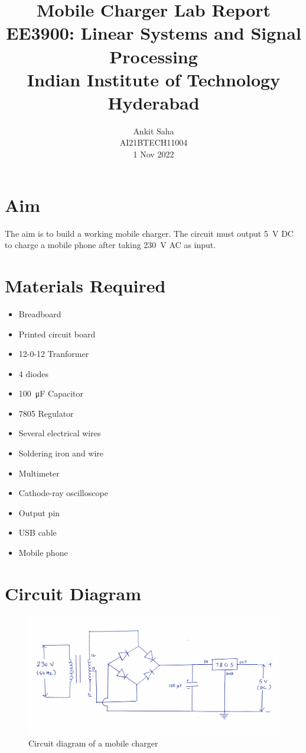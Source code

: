 \documentclass[journal,12pt,twocolumn]{IEEEtran}
\title{Mobile Charger Lab Report \\ \Large EE3900: Linear Systems and Signal Processing \\ \large Indian Institute of Technology Hyderabad}
\author{Ankit Saha \\ \normalsize AI21BTECH11004 \\ \vspace*{20pt} \normalsize 1 Nov 2022}
\numberwithin{equation}{section}
\numberwithin{figure}{section}
\begin{document}
	\maketitle

	\section{Aim}
	The aim is to build a working mobile charger. The circuit must output \SI{5}{\volt} DC to charge a mobile phone after taking \SI{230}{\volt} AC as input.
	
	\section{Materials Required}
	\begin{itemize}
	\item Breadboard
	\item Printed circuit board
	\item 12-0-12 Tranformer
	\item 4 diodes
	\item \SI{100}{\micro\farad} Capacitor
	\item 7805 Regulator
	\item Several electrical wires
	\item Soldering iron and wire
	\item Multimeter
	\item Cathode-ray oscilloscope
	\item Output pin
	\item USB cable
	\item Mobile phone
	\end{itemize}

	\section{Circuit Diagram}
	\begin{figure}[!ht]
		\centering
		\includegraphics[width=\columnwidth]{./figs/circuit.pdf}
		\caption{Circuit diagram of a mobile charger}
		\label{fig-ckt}	
	\end{figure}
	
\end{document}
